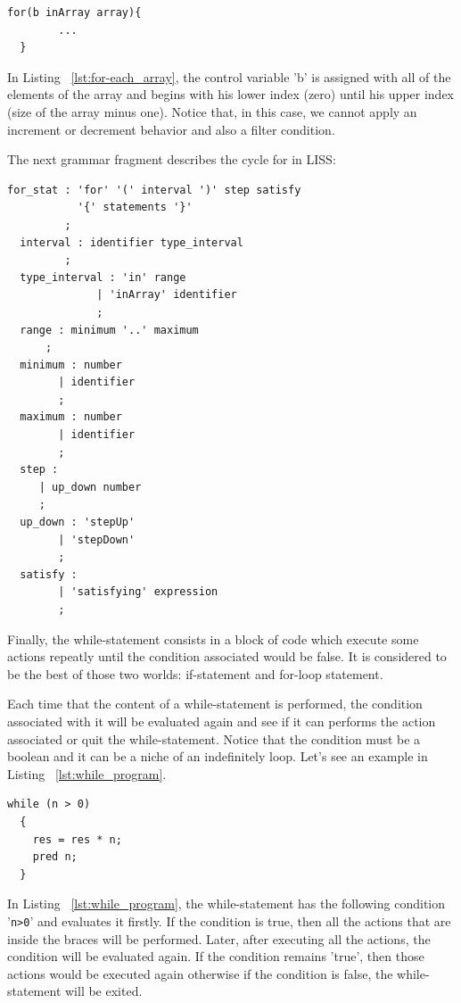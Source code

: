\documentclass[
  oneside,
  11pt, a4paper,
  footinclude=true,
  headinclude=true,
  cleardoublepage=empty
]{scrbook}
\begin{document}
\begin{lstlisting}[caption={LISS syntax of a for-each statement on array},label={lst:for-each_array}]
  for(b inArray array){
       	...
  }
\end{lstlisting}
In Listing ~\ref{lst:for-each_array}, the control variable  'b' is assigned with all of the elements of the array and begins with his lower index (zero) until his upper index (size of the array minus one).
Notice that, in this case, we cannot apply an increment or decrement behavior and also a filter condition.

The next grammar fragment describes the cycle for in LISS:

\begin{lstlisting}[caption={BNF of for statement in LISS}]
  for_stat : 'for' '(' interval ')' step satisfy
           '{' statements '}'
         ;
  interval : identifier type_interval
         ;
  type_interval : 'in' range
              | 'inArray' identifier
              ;
  range : minimum '..' maximum
      ;
  minimum : number
        | identifier
        ;
  maximum : number
        | identifier
        ;
  step :
     | up_down number
     ;
  up_down : 'stepUp'
        | 'stepDown'
        ;
  satisfy :
        | 'satisfying' expression
        ;
\end{lstlisting}


Finally, the while-statement consists in a block of code which execute some actions repeatly until the condition associated would be false. It is considered to be the best of those two worlds: if-statement and for-loop statement.

Each time that the content of a while-statement is performed, the condition associated with it will be evaluated again and see if it can performs the action associated or quit the while-statement.
Notice that the condition must be a boolean and it can be a niche of an indefinitely loop.
Let's see an example in Listing ~\ref{lst:while_program}.

\begin{lstlisting}[caption={LISS syntax of a while-statement in LISS},label={lst:while_program}]
  while (n > 0)
  {
    res = res * n;
    pred n;
  }
\end{lstlisting}

In Listing ~\ref{lst:while_program}, the while-statement has the following condition '\verb+n>0+' and evaluates it firstly. If the condition is true, then all the actions that are inside the braces will be performed. Later, after executing all the actions, the condition will be evaluated again. If the condition remains 'true', then those actions would be executed again otherwise if the condition is false, the while-statement will be exited.
\end{document}
